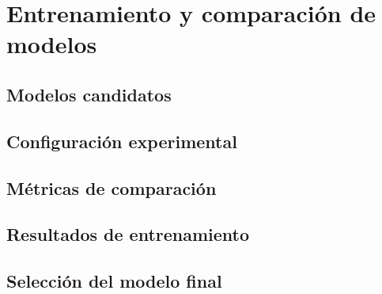 \section{Entrenamiento y comparación de modelos}

\subsection{Modelos candidatos}

\subsection{Configuración experimental}

\subsection{Métricas de comparación}

\subsection{Resultados de entrenamiento}

\subsection{Selección del modelo final}


